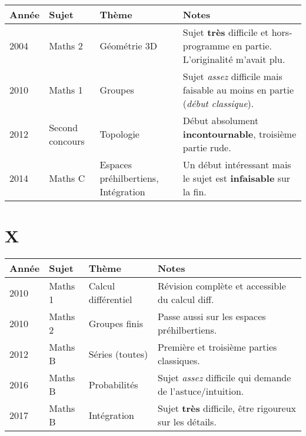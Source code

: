 \documentclass{article}
\begin{document}
\begin{tabular}{ |p{1cm} | p{2cm} | p{3cm} | p{8cm}| }
 Année  &  Sujet            &  Thème                                &  Notes \\
\hline\hline

 2004   &  Maths 2          &  Géométrie 3D                         &  Sujet \textbf{très} difficile et hors-programme en partie. L'originalité m'avait plu. \\\hline

 2010   &  Maths 1          &  Groupes                              &  Sujet \textit{assez} difficile mais faisable au moins en partie (\textit{début classique}). \\\hline

 2012   &  Second concours  &  Topologie                            &  Début absolument \textbf{incontournable}, troisième partie rude. \\\hline

 2014   &  Maths C          &  Espaces préhilbertiens, Intégration  &  Un début intéressant mais le sujet est \textbf{infaisable} sur la fin. \\\hline

\end{tabular}

\section{X}

\begin{tabular}{ |p{1cm} | p{2cm} | p{3cm} | p{8cm}| }
 Année  &  Sujet            &  Thème                                &  Notes \\
\hline\hline

 2010   &  Maths 1          &  Calcul différentiel                  &  Révision complète et accessible du calcul diff. \\\hline

 2010   &  Maths 2          &  Groupes finis                        &  Passe aussi sur les espaces préhilbertiens. \\\hline

 2012   &  Maths B          &  Séries (toutes)                      &  Première et troisième parties classiques. \\\hline

 2016   &  Maths B          &  Probabilités                         &  Sujet \textit{assez} difficile qui demande de l'astuce/intuition. \\\hline

 2017   &  Maths B          &  Intégration                          &  Sujet \textbf{très} difficile, être rigoureux sur les détails. \\\hline

\end{tabular}
\end{document}
